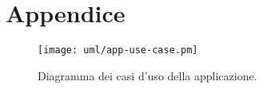 \section*{Appendice}

\begin{figure}[H]
    \centering
    \texttt{[image: uml/app-use-case.pm]}
    \caption{Diagramma dei casi d'uso della applicazione.}
    \label{fig:app-use-case}
\end{figure}

